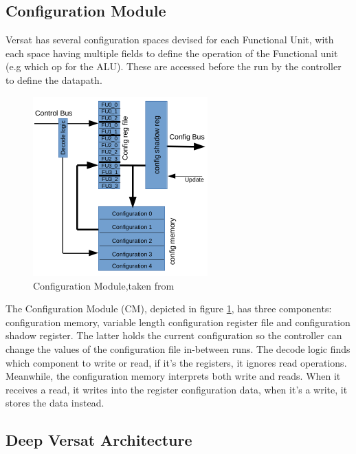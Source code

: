\newpage
\subsection{Configuration Module}
\quad Versat has several configuration spaces devised for each Functional Unit,
with each space having multiple fields to define the operation of the Functional unit (e.g which op for the ALU).
These are accessed before the run by the controller to define the datapath.

\begin{figure}[!htbp]
    \centering
    \includegraphics[width=0.6\textwidth]{Figures/conf.png}
    \caption{Configuration Module,taken from~\cite{sousa:controller}}
    \label{figure:conf}
\end{figure} 

The Configuration Module (CM), depicted in figure \ref{figure:conf}, 
has three components: configuration memory, variable length configuration register file 
and configuration shadow register.
The latter holds the current configuration so the controller can change the values of the configuration file in-between runs.
The decode logic finds which component to write or read, if it's the registers, it ignores read operations.
Meanwhile, the configuration memory interprets both write and reads. When it receives a read,
it writes into the register configuration data, when it's a write, it stores the data instead.


\newpage
\subsection{Deep Versat Architecture}


